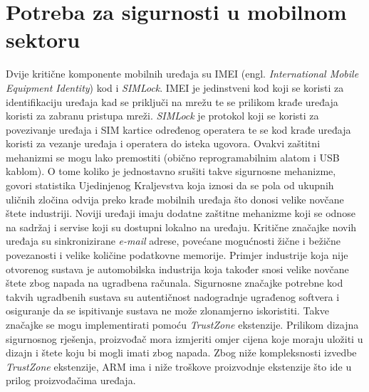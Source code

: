 \documentclass[times, utf8, diplomski, numeric]{fer}
\begin{document}
\section{Potreba za sigurnosti u mobilnom sektoru}
Dvije kritične komponente mobilnih uređaja su IMEI (engl. \textit{International Mobile Equipment Identity}) kod i
\textit{SIMLock}. IMEI je jedinstveni kod koji se koristi za identifikaciju uređaja kad se priključi na mrežu te se prilikom
krađe uređaja koristi za zabranu pristupa mreži. \textit{SIMLock} je protokol koji se koristi za povezivanje uređaja i
SIM kartice određenog operatera te se kod krađe uređaja koristi za vezanje uređaja i operatera do isteka ugovora. Ovakvi
zaštitni mehanizmi se mogu lako premostiti (obično reprogramabilnim alatom i USB kablom). O tome koliko je jednostavno
srušiti takve sigurnosne mehanizme, govori statistika Ujedinjenog Kraljevstva koja iznosi da se pola od ukupnih uličnih
zločina odvija preko krađe mobilnih uređaja što donosi velike novčane štete industriji. Noviji uređaji imaju dodatne
zaštitne mehanizme koji se odnose na sadržaj i servise koji su dostupni lokalno na uređaju. Kritične značajke novih
uređaja su sinkronizirane \textit{e-mail} adrese, povećane mogućnosti žične i bežične povezanosti i velike količine
podatkovne memorije. Primjer industrije koja nije otvorenog sustava je automobilska industrija koja također snosi velike
novčane štete zbog napada na ugradbena računala. Sigurnosne značajke potrebne kod takvih ugradbenih sustava su autentičnost
nadogradnje ugrađenog softvera i osiguranje da se ispitivanje sustava ne može zlonamjerno iskoristiti.
Takve značajke se mogu implementirati pomoću \textit{TrustZone} ekstenzije. Prilikom dizajna sigurnosnog rješenja, proizvođač
mora izmjeriti omjer cijena koje moraju uložiti u dizajn i štete koju bi mogli imati zbog napada. Zbog niže kompleksnosti
izvedbe \textit{TrustZone} ekstenzije, ARM ima i niže troškove proizvodnje ekstenzije što ide u prilog proizvođačima
uređaja.
\end{document}
